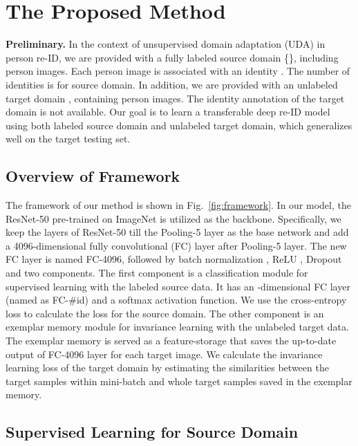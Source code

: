 \documentclass[10pt,twocolumn,letterpaper]{article}
\begin{document}
\section{The Proposed Method}

\textbf{Preliminary.} In the context of unsupervised domain adaptation (UDA) in person re-ID, we are provided with a fully labeled source domain \{\}, including  person images. Each person image  is associated with an identity . The number of identities is  for source domain. In addition, we are provided with an unlabeled target domain , containing  person images. The identity annotation of the target domain is not available. Our goal is to learn a transferable deep re-ID model using both labeled source domain and unlabeled target domain, which generalizes well on the target testing set.


\subsection{Overview of Framework}

The framework of our method is shown in Fig.~\ref{fig:framework}. In our model, the ResNet-50 \cite{resnet} pre-trained on ImageNet \cite{deng2009imagenet} is utilized as the backbone. Specifically, we keep the layers of ResNet-50 till the Pooling-5 layer as the base network and add a 4096-dimensional fully convolutional (FC) layer after Pooling-5 layer. The new FC layer is named FC-4096, followed by batch normalization \cite{ioffe2015batch}, ReLU \cite{nair2010relu}, Dropout \cite{srivastava2014dropout} and two components. The first component is a classification module for supervised learning with the labeled source data. It has an -dimensional FC layer (named as FC-\#id) and a softmax activation function. We use the cross-entropy loss to calculate the loss for the source domain. The other component is an exemplar memory module for invariance learning with the unlabeled target data. The exemplar memory is served as a feature-storage that saves the up-to-date output of FC-4096 layer for each target image. We calculate the invariance learning loss of the target domain by estimating the similarities between the target samples within mini-batch and whole target samples saved in the exemplar memory.


\subsection{Supervised Learning for Source Domain}
\end{document}
